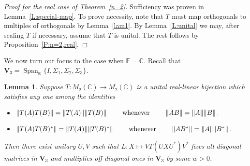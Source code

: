 \documentclass[11pt]{article}
\newtheorem{lemma}[theorem]{Lemma}
\numberwithin{equation}{section}
\def\IF{{\mathbb F}}
\def\IC{{\mathbb C}}
\def\IR{{\mathbb R}}
\def\bV{{\mathbf V}}
\def\span{{\mathop{\mathrm{Span}}\nolimits}}
\def\bV{{\mathbf V}}
\begin{document}
\begin{proof}[Proof for the real case of  Theorem~\ref{n=2}] Sufficiency was proven in Lemma~\ref{L:special-map}.
To prove necessity, note that
$T$ must map orthogonals to multiples of orthogonals by Lemma~\ref{lam1}.
   By Lemma~\ref{L:unital} we may, after scaling $T$ if necessary, assume that $T$ is unital. The rest follows by Proposition~\ref{P:n=2,real}.
\end{proof}
\smallskip

We now turn our focus to the case when $\IF = \IC$.
Recall that  $\bV_3=\span_{\IR}\{I,\Sigma_1,\Sigma_2,\Sigma_3\}$.

\begin{lemma}\label{lem:aux2-by-2-reallinear}
 	Suppose $T\colon M_2(\IC) \rightarrow M_2(\IC)$ is a  unital real-linear bijection which satisfies any one among the identities
    \begin{itemize}
     \item[{\rm (i)}] $\|T(A)T(B)\| = \|T(A)\| \|T(B)\| \qquad \hbox{ whenever } \qquad \|AB\| = \|A\| \|B\|$.
     \item[{\rm (ii)}] $\|T(A)T(B)^\ast\| = \|T(A)\| \|T(B)^\ast\| \qquad \hbox{ whenever } \qquad \|AB^\ast\| = \|A\| \|B^\ast\|$.
      \end{itemize}
	Then there exist  unitary $U,V$ such that $L\colon X\mapsto  V T(U XU^\ast)V^\ast$ fixes all diagonal matrices in $\bV_3$ and multiplies off-diagonal ones in $\bV_3$  by some $w>0$.
\end{lemma}
\end{document}
